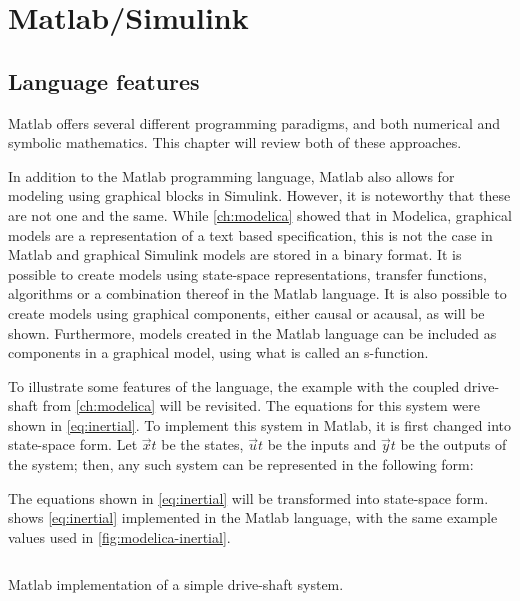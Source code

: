 \documentclass[\rootfolder/main.tex]{subfiles}
\begin{document}
\chapter{Matlab/Simulink} %

\label{ch:matlab} %

\section{Language features}

Matlab offers several different programming paradigms, and both numerical and symbolic mathematics.
This chapter will review both of these approaches.

In addition to the Matlab programming language, Matlab also allows for modeling using graphical blocks in Simulink.
However, it is noteworthy that these are not one and the same.
While \cref{ch:modelica} showed that in Modelica, graphical models are a representation of a text based specification, this is not the case in Matlab and graphical Simulink models are stored in a binary format.
It is possible to create models using state-space representations, transfer functions, algorithms or a combination thereof in the Matlab language.
It is also possible to create models using graphical components, either causal or acausal, as will be shown.
Furthermore, models created in the Matlab language can be included as components in a graphical model, using what is called an s-function.

To illustrate some features of the language, the example with the coupled drive-shaft from \cref{ch:modelica} will be revisited.
The equations for this system were shown in \cref{eq:inertial}.
To implement this system in Matlab, it is first changed into state-space form.
Let $\vec{x}{t}$ be the states, $\vec{u}{t}$ be the inputs and $\vec{y}{t}$ be the outputs of the system; then, any such system can be represented in the following form:


The equations shown in \cref{eq:inertial} will be transformed into state-space form.
 shows \cref{eq:inertial} implemented in the Matlab language, with the same example values used in \cref{fig:modelica-inertial}.

\begin{listing}[ht]
    \inputminted{matlab}{\rootfolder/Models/Matlab/InertialMatlab.m}
    \caption{Matlab implementation of a simple drive-shaft system.\label{lst:matlab-inertial}}
\end{listing}
\end{document}
